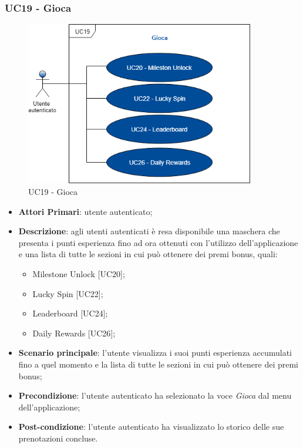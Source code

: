 \subsubsection{UC19 - Gioca}
 \begin{figure}[h]
	\includegraphics[width=10cm]{res/images/UC19Gioca.png}
	\centering
	\caption{UC19 - Gioca}
\end{figure}
\begin{itemize}
	\item \textbf{Attori Primari}: utente autenticato;
	\item \textbf{Descrizione}: agli utenti autenticati è resa disponibile una maschera che presenta i punti esperienza fino ad ora ottenuti con l'utilizzo dell'applicazione e una lista di tutte le sezioni in cui può ottenere dei premi bonus, quali:
	\begin{itemize}
		\item Milestone Unlock [UC20];
		\item Lucky Spin [UC22];
		\item Leaderboard [UC24];
		\item Daily Rewards [UC26];
	\end{itemize} 
	\item \textbf{Scenario principale}: l'utente visualizza i suoi punti esperienza accumulati fino a quel momento e la lista di tutte le sezioni in cui può ottenere dei premi bonus;
	\item \textbf{Precondizione}: l'utente autenticato ha selezionato la voce \textit{Gioca} dal menu dell'applicazione;
	\item \textbf{Post-condizione}: l'utente autenticato ha visualizzato lo storico delle sue prenotazioni concluse. 
\end{itemize} 
